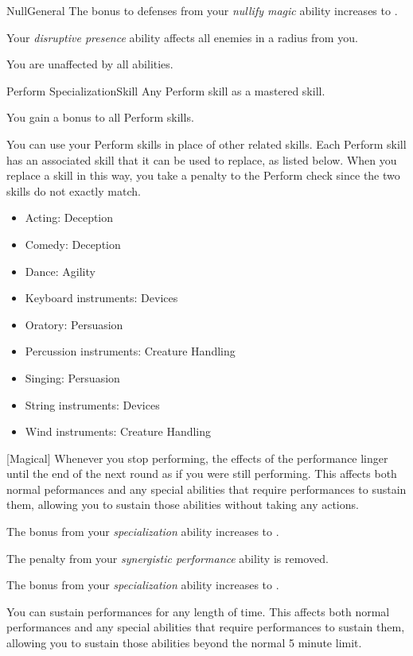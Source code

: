 \begin{feat}{Null}{General}
         The bonus to defenses from your \textit{nullify magic} ability increases to .

         Your \textit{disruptive presence} ability affects all enemies in a \arealarge radius  from you.

         You are unaffected by all  abilities.
    \end{feat}

    \begin{feat}{Perform Specialization}{Skill}
        \featpre Any Perform skill as a mastered skill.

         You gain a  bonus to all Perform skills.

         You can use your Perform skills in place of other related skills.
        Each Perform skill has an associated skill that it can be used to replace, as listed below.
        When you replace a skill in this way, you take a  penalty to the Perform check since the two skills do not exactly match.
        \begin{itemize}
            \item Acting: Deception
            \item Comedy: Deception
            \item Dance: Agility
            \item Keyboard instruments: Devices
            \item Oratory: Persuasion
            \item Percussion instruments: Creature Handling
            \item Singing: Persuasion
            \item String instruments: Devices
            \item Wind instruments: Creature Handling
        \end{itemize}

        [Magical] Whenever you stop performing, the effects of the performance linger until the end of the next round as if you were still performing.
        This affects both normal peformances and any special abilities that require performances to sustain them, allowing you to sustain those abilities without taking any actions.

         The bonus from your \textit{specialization} ability increases to .

         The penalty from your \textit{synergistic performance} ability is removed.

         The bonus from your \textit{specialization} ability increases to .

         You can sustain performances for any length of time.
        This affects both normal performances and any special abilities that require performances to sustain them, allowing you to sustain those abilities beyond the normal 5 minute limit.
    \end{feat}

